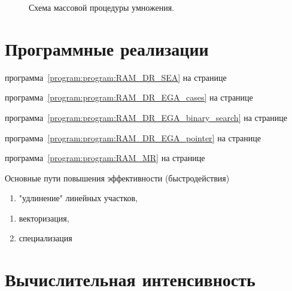 \documentclass[a4paper,12pt]{report}
\newcommand{\programreferencewithpage}[1]{программа~\ref{program:#1} на странице~\pageref{program:#1}}
\begin{document}
\begin{figure}[h!]
	\caption{Схема массовой процедуры умножения.}
	\label{figures:RAM_MR_scheme}
\end{figure}

\section { Программные реализации }

\programreferencewithpage{program:RAM_DR_SEA}

\programreferencewithpage{program:RAM_DR_EGA_cases}

\programreferencewithpage{program:RAM_DR_EGA_binary_search}

\programreferencewithpage{program:RAM_DR_EGA_pointer}

\programreferencewithpage{program:RAM_MR}

Основные пути повышения эффективности (быстродействия)
\begin{enumerate}
	\item "удлинение"{} линейных участков,
\end{enumerate}

\begin{enumerate}
	\item векторизация,
	\item специализация
\end{enumerate}

\section{Вычислительная интенсивность}
\end{document}

